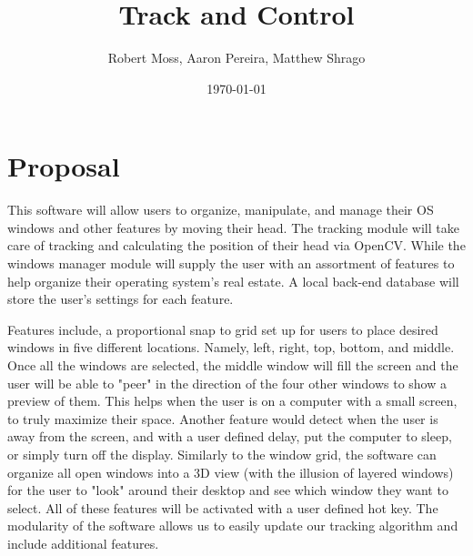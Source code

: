 \documentclass[12pt]{article}
\title{Track and Control}
\author{Robert Moss, Aaron Pereira, Matthew Shrago}
\date{\today}
\begin{document}
\maketitle

\section{Proposal}

This software will allow users to organize, manipulate, and manage their OS windows and other features by moving their head. The tracking module will take care of tracking and calculating the position of their head via OpenCV. While the windows manager module will supply the user with an assortment of features to help organize their operating system's real estate. A local back-end database will store the user's settings for each feature.

Features include, a proportional snap to grid set up for users to place desired windows in five different locations. Namely, left, right, top, bottom, and middle. Once all the windows are selected, the middle window will fill the screen and the user will be able to "peer" in the direction of the four other windows to show a preview of them. This helps when the user is on a computer with a small screen, to truly maximize their space. Another feature would detect when the user is away from the screen, and with a user defined delay, put the computer to sleep, or simply turn off the display. Similarly to the window grid, the software can organize all open windows into a 3D view (with the illusion of layered windows) for the user to "look" around their desktop and see which window they want to select. All of these features will be activated with a user defined hot key. The modularity of the software allows us to easily update our tracking algorithm and include additional features.
\end{document}
